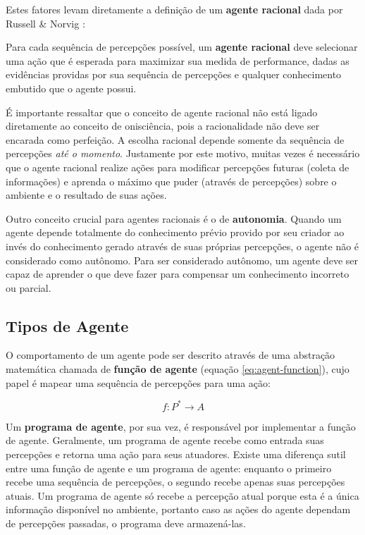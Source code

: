 Estes fatores levam diretamente a definição de um \textbf{agente racional} dada
por Russell \& Norvig \cite{RussellNorvig200912}:

\begin{directcite}
	Para cada sequência de percepções possível, um \textbf{agente racional} deve
	selecionar uma ação que é esperada para maximizar sua medida de performance,
	dadas as evidências providas por sua sequência de percepções e qualquer
	conhecimento embutido que o agente possui.
\end{directcite}

É importante ressaltar que o conceito de agente racional não está ligado
diretamente ao conceito de onisciência, pois a racionalidade não deve ser
encarada como perfeição. A escolha racional depende somente da sequência de
percepções \textit{até o momento}. Justamente por este motivo, muitas vezes é
necessário que o agente racional realize ações para modificar percepções futuras
(coleta de informações) e aprenda o máximo que puder (através de percepções)
sobre o ambiente e o resultado de suas ações.

Outro conceito crucial para agentes racionais é o de \textbf{autonomia}. Quando
um agente depende totalmente do conhecimento prévio provido por seu criador ao
invés do conhecimento gerado através de suas próprias percepções, o agente não é
considerado como autônomo. Para ser considerado autônomo, um agente deve ser
capaz de aprender o que deve fazer para compensar um conhecimento incorreto ou
parcial. 

\subsection{Tipos de Agente}
O comportamento de um agente pode ser descrito através de uma abstração
matemática chamada de \textbf{função de agente} (equação
\ref{eq:agent-function}), cujo papel é mapear uma sequência de percepções para
uma ação:

\begin{equation}
	\label{eq:agent-function}
	f : P^* \rightarrow A
\end{equation}

Um \textbf{programa de agente}, por sua vez, é responsável por implementar a
função de agente. Geralmente, um programa de agente recebe como entrada suas
percepções e retorna uma ação para seus atuadores. Existe uma diferença sutil
entre uma função de agente e um programa de agente: enquanto o primeiro recebe
uma sequência de percepções, o segundo recebe apenas suas percepções atuais. Um
programa de agente só recebe a percepção atual porque esta é a única informação
disponível no ambiente, portanto caso as ações do agente dependam de percepções
passadas, o programa deve armazená-las.

